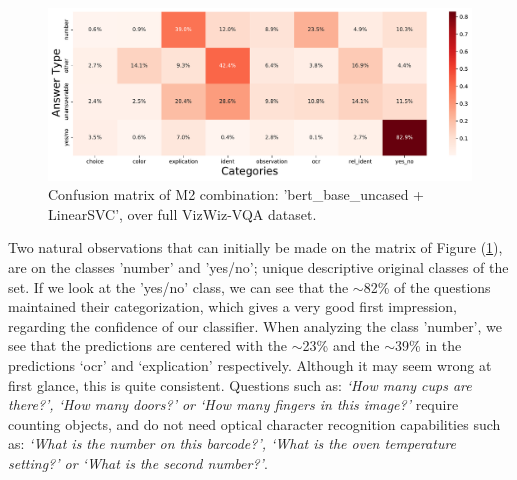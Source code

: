 \begin{figure}[ht!]
    \centering
    \includegraphics[width=\linewidth]{images/testing/mc_m2_v2.pdf}
\caption{Confusion matrix of M2 combination: 'bert\_base\_uncased + LinearSVC', over full VizWiz-VQA dataset.}
\label{fig:mco_mod2}
\end{figure}


Two natural observations that can initially be made on the matrix of Figure (\ref{fig:mco_mod2}), are on the classes 'number' and 'yes/no'; unique descriptive original classes of the set. If we look at the 'yes/no' class, we can see that the $\sim$82\% of the questions maintained their categorization, which gives a very good first impression, regarding the confidence of our classifier.
When analyzing the class 'number', we see that the predictions are centered with the $\sim$23\% and the $\sim$39\% in the predictions `ocr' and `explication' respectively. Although it may seem wrong at first glance, this is quite consistent. Questions such as: \emph{`How many cups are there?', `How many doors?' or `How many fingers in this image?'} require counting objects, and do not need optical character recognition capabilities such as: \emph{`What is the number on this barcode?', `What is the oven temperature setting?' or `What is the second number?'}.

